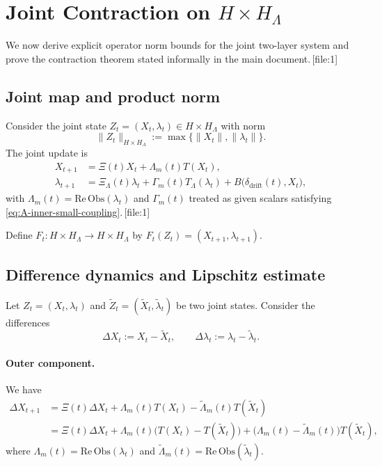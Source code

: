 \documentclass[11pt]{article}
\begin{document}
\section{Joint Contraction on \texorpdfstring{$H\times H_\Lambda$}{H x H\_Lambda}}

We now derive explicit operator norm bounds for the joint two-layer system and prove the contraction theorem stated informally in the main document.\,[file:1]

\subsection{Joint map and product norm}

Consider the joint state $Z_t=(X_t,\lambda_t)\in H\times H_\Lambda$ with norm
\[
\|Z_t\|_{H\times H_\Lambda} := \max\{\|X_t\|,\|\lambda_t\|\}.
\]
The joint update is
\[
\begin{aligned}
X_{t+1} &= \Xi(t) X_t + \Lambda_m(t) T(X_t),\\
\lambda_{t+1} &= \Xi_\Lambda(t)\lambda_t + \Gamma_m(t) T_\Lambda(\lambda_t) 
                + B\bigl(\delta_{\mathrm{drift}}(t),X_t\bigr),
\end{aligned}
\]
with $\Lambda_m(t) = \mathrm{Re}\,\mathrm{Obs}(\lambda_t)$ and $\Gamma_m(t)$ treated as given scalars satisfying \eqref{eq:A-inner-small-coupling}.\,[file:1]

Define $F_t: H\times H_\Lambda\to H\times H_\Lambda$ by $F_t(Z_t)=(X_{t+1},\lambda_{t+1})$.

\subsection{Difference dynamics and Lipschitz estimate}

Let $Z_t=(X_t,\lambda_t)$ and $\tilde{Z}_t=(\tilde{X}_t,\tilde{\lambda}_t)$ be two joint states. Consider the differences
\[
\Delta X_t := X_t - \tilde{X}_t,\qquad
\Delta\lambda_t := \lambda_t - \tilde{\lambda}_t.
\]

\paragraph{Outer component.} We have
\begin{align*}
\Delta X_{t+1}
&= \Xi(t)\Delta X_t + \Lambda_m(t) T(X_t) - \tilde{\Lambda}_m(t) T(\tilde{X}_t)\\
&= \Xi(t)\Delta X_t 
   + \Lambda_m(t)\bigl(T(X_t)-T(\tilde{X}_t)\bigr)
   + \bigl(\Lambda_m(t)-\tilde{\Lambda}_m(t)\bigr) T(\tilde{X}_t),
\end{align*}
where $\Lambda_m(t)=\mathrm{Re}\,\mathrm{Obs}(\lambda_t)$ and $\tilde{\Lambda}_m(t)=\mathrm{Re}\,\mathrm{Obs}(\tilde{\lambda}_t)$.
\end{document}

